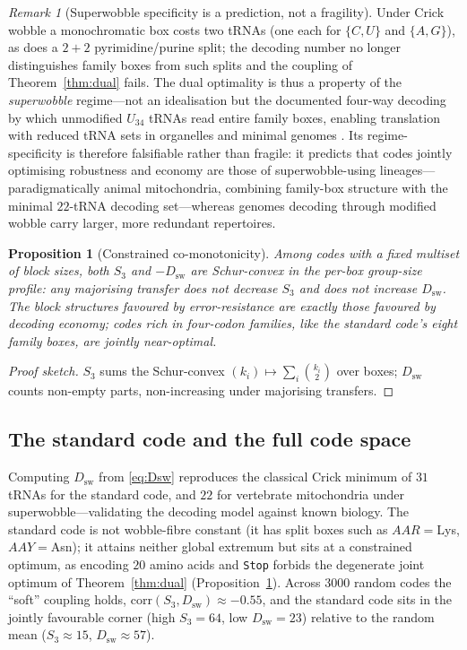 \documentclass[11pt]{article}
\newtheorem{proposition}{Proposition}
\theoremstyle{remark}
\newtheorem{remark}{Remark}
\newcommand{\Dsw}{D_{\mathrm{sw}}}
\newcommand{\Sthree}{S_3}
\begin{document}
\begin{remark}[Superwobble specificity is a prediction, not a fragility]\label{rmk:crick}
Under Crick wobble a monochromatic box costs two tRNAs (one each for $\{C,U\}$
and $\{A,G\}$), as does a $2{+}2$ pyrimidine/purine split; the decoding number
no longer distinguishes family boxes from such splits and the coupling of
Theorem~\ref{thm:dual} fails. The dual optimality is thus a property of the
\emph{superwobble} regime---not an idealisation but the documented four-way
decoding by which unmodified $U_{34}$ tRNAs read entire family boxes, enabling
translation with reduced tRNA sets in organelles and minimal genomes
\cite{rogalski,agris}. Its regime-specificity is therefore falsifiable rather
than fragile: it predicts that codes jointly optimising robustness and economy
are those of superwobble-using lineages---paradigmatically animal mitochondria,
combining family-box structure with the minimal $22$-tRNA decoding set---whereas
genomes decoding through modified wobble carry larger, more redundant
repertoires.
\end{remark}

\begin{proposition}[Constrained co-monotonicity]\label{prop:constr}
Among codes with a fixed multiset of block sizes, both $\Sthree$ and $-\Dsw$ are
Schur-convex in the per-box group-size profile: any majorising transfer does not
decrease $\Sthree$ and does not increase $\Dsw$. The block structures favoured by
error-resistance are exactly those favoured by decoding economy; codes rich in
four-codon families, like the standard code's eight family boxes, are jointly
near-optimal.
\end{proposition}
\begin{proof}[Proof sketch]
$\Sthree$ sums the Schur-convex $(k_i)\mapsto\sum_i\binom{k_i}{2}$ over boxes;
$\Dsw$ counts non-empty parts, non-increasing under majorising transfers.
\end{proof}

\subsection{The standard code and the full code space}

Computing $\Dsw$ from \eqref{eq:Dsw} reproduces the classical Crick minimum of
$31$ tRNAs for the standard code, and $22$ for vertebrate mitochondria under
superwobble---validating the decoding model against known biology. The standard
code is not wobble-fibre constant (it has split boxes such as $AAR=$Lys,
$AAY=$Asn); it attains neither global extremum but sits at a constrained
optimum, as encoding $20$ amino acids and \texttt{Stop} forbids the degenerate
joint optimum of Theorem~\ref{thm:dual} (Proposition~\ref{prop:constr}). Across
$3000$ random codes the ``soft'' coupling holds, $\mathrm{corr}(\Sthree,\Dsw)
\approx-0.55$, and the standard code sits in the jointly favourable corner (high
$\Sthree=64$, low $\Dsw=23$) relative to the random mean ($\Sthree\approx15$,
$\Dsw\approx57$).
\end{document}
